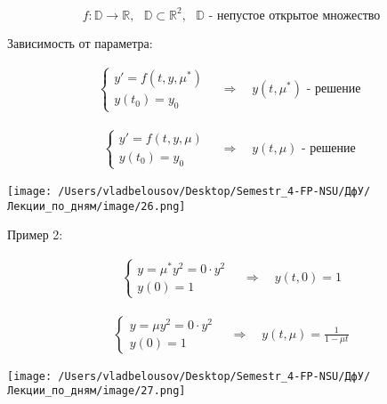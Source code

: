 \documentclass[12pt, a4paper]{report}
\begin{document}
\fi

\[ f: \mathbb{D} \to  \mathbb{R}     , \text{ } \mathbb{D} \subset \mathbb{R} ^2  , \text{ } \mathbb{D} \text{ - непустое открытое множество} \] 

Зависимость от параметра: 

\[ \begin{aligned}
    \begin{cases}
        y ' = f(t, y , \mu^* ) \\
        y(t_0 )= y_0
        \end{cases}
        \quad  \Rightarrow \quad 
        y(t, \mu^* ) \text{ - решение } 
\end{aligned} \] 

\[ \begin{aligned}
    \begin{cases}
        y ' = f(t , y , \mu ) \\
        y(t_0 )= y_0
        \end{cases} 
        \quad \Rightarrow \quad      
        y(t, \mu )  \text{ - решение } 
\end{aligned}\]

\begin{center}
    \texttt{[image: /Users/vladbelousov/Desktop/Semestr\_4-FP-NSU/ДфУ/Лекции\_по\_дням/image/26.png]}
\end{center}

Пример 2: 

\[ \begin{aligned}
    \begin{cases}
        y = \mu^{* }  y ^2 = 0 \cdot y ^2 \\
        y(0 ) = 1
        \end{cases} 
        \quad \Rightarrow \quad 
        y(t,0 ) =1
\end{aligned}\] 

\[ \begin{aligned}
    \begin{cases}
        y = \mu  y ^2 = 0 \cdot y ^2 \\
        y(0 ) = 1
        \end{cases} 
        \quad \Rightarrow \quad 
        y(t,\mu ) = \frac{1}{1 - \mu t } 
\end{aligned}\] 

\begin{center}
    \texttt{[image: /Users/vladbelousov/Desktop/Semestr\_4-FP-NSU/ДфУ/Лекции\_по\_дням/image/27.png]}
\end{center}
\end{document}
